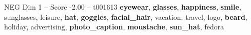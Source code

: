 \begin{textsample}{NEG Dim 1 – Score -2.00 – t001613}  \label{ex:f1_neg_004}
\textbf{eyewear}, \textbf{glasses}, \textbf{happiness}, \textbf{smile}, sunglasses, leisure, \textbf{hat}, \textbf{goggles}, \textbf{facial\_hair}, vacation, travel, logo, \textbf{beard}, holiday, advertising, \textbf{photo\_caption}, \textbf{moustache}, \textbf{sun\_hat}, fedora

\end{textsample}
